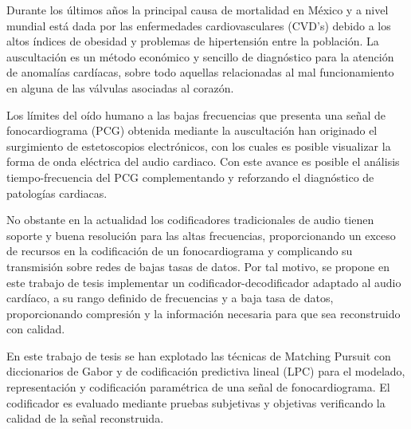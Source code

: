 
Durante los últimos años la principal causa de mortalidad en México y a nivel mundial está dada por las enfermedades cardiovasculares (CVD's) debido a los altos índices de obesidad y problemas de hipertensión entre la población. La auscultación es un método económico y sencillo de diagnóstico para la atención de anomalías cardíacas, sobre todo aquellas relacionadas al mal funcionamiento en alguna de las válvulas asociadas al corazón. 

Los límites del oído humano a las bajas frecuencias que presenta una señal de fonocardiograma (PCG) obtenida mediante la auscultación han originado el surgimiento de estetoscopios electrónicos, con los cuales es posible visualizar la forma de onda eléctrica del audio cardiaco. Con este avance es posible el análisis tiempo-frecuencia del PCG complementando y reforzando el diagnóstico de patologías cardiacas.

No obstante en la actualidad los codificadores tradicionales de audio tienen soporte y buena resolución para las altas frecuencias, proporcionando un exceso de recursos en la codificación de un fonocardiograma y complicando su transmisión sobre redes de bajas tasas de datos. Por tal motivo, se propone en este trabajo de tesis implementar un codificador-decodificador adaptado al audio cardíaco, a su rango definido de frecuencias y a baja tasa de datos, proporcionando compresión y la información necesaria para que sea reconstruido con calidad.

En este trabajo de tesis se han explotado las técnicas de Matching Pursuit con diccionarios de Gabor y de codificación predictiva lineal (LPC) para el modelado, representación y codificación paramétrica de una señal de fonocardiograma. El codificador es evaluado mediante pruebas subjetivas y objetivas verificando la calidad de la señal reconstruida. 


